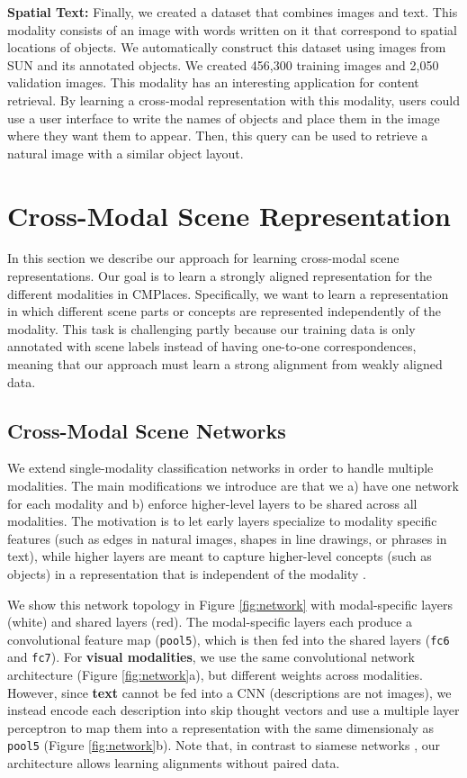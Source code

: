 \documentclass[10pt,journal,compsoc]{IEEEtran}
\begin{document}
	\textbf{Spatial Text:} 
	Finally, we created a dataset that combines images and text. This modality consists of an image with words written on it that correspond to spatial locations of objects. We automatically construct this dataset using images from SUN \cite{xiao2010sun} and its annotated objects. We created 456,300 training images and 2,050 validation images. This modality has an interesting application for content retrieval. By learning a cross-modal representation with this modality, users could use a user interface to write the names of objects and place them in the image where they want them to appear. Then, this query can be used to retrieve a natural image with a similar object layout. 


\section{Cross-Modal Scene Representation}

    In this section we describe our approach for learning cross-modal scene representations. Our goal is to learn a strongly aligned representation for the different modalities in CMPlaces. Specifically, we want to learn a representation in which different scene parts or concepts are represented independently of the modality. This task is challenging partly because our training data is only annotated with scene labels instead of having one-to-one correspondences, meaning that our approach must learn a strong alignment from weakly aligned data.
    
    
    \subsection{Cross-Modal Scene Networks}
    We extend single-modality classification networks \cite{krizhevsky2012imagenet} in order to handle multiple modalities. The main modifications we introduce are that we a) have one network for each modality and b) enforce higher-level layers to be shared across all modalities. The motivation is to let early layers specialize to modality specific features (such as edges in natural images, shapes in line drawings, or phrases in text), while higher layers are meant to capture higher-level concepts (such as objects) in a representation that is independent of the modality .
    
    We show this network topology in Figure \ref{fig:network} with modal-specific layers (white) and shared layers (red). The modal-specific layers each produce a convolutional feature map (\texttt{pool5}), which is then fed into the shared layers (\texttt{fc6} and \texttt{fc7}). For \textbf{visual modalities}, we use the same convolutional network architecture (Figure \ref{fig:network}a), but different weights across modalities. However, since \textbf{text} cannot be fed into a CNN (descriptions are not images), we instead encode each description into skip thought vectors \cite{kiros2015skip} and use a multiple layer perceptron to map them into a representation with the same dimensionaly as \texttt{pool5} (Figure \ref{fig:network}b). Note that, in contrast to siamese networks \cite{bromley1993signature}, our architecture allows learning alignments without paired data. 
    
\end{document}
